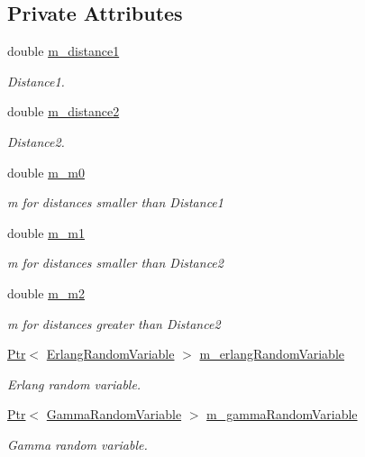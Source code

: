 \subsection*{Private Attributes}
\begin{DoxyCompactItemize}
\item 
double \hyperlink{classns3_1_1NakagamiPropagationLossModel_a4066585afe1a07e79bfc70bd64f06b80}{m\+\_\+distance1}
\begin{DoxyCompactList}\small\item\em Distance1. \end{DoxyCompactList}\item 
double \hyperlink{classns3_1_1NakagamiPropagationLossModel_a5b352f7546d5eb117c80bcc09fb76bca}{m\+\_\+distance2}
\begin{DoxyCompactList}\small\item\em Distance2. \end{DoxyCompactList}\item 
double \hyperlink{classns3_1_1NakagamiPropagationLossModel_a188d8e524f49ac1dfcb56b7788807e6c}{m\+\_\+m0}
\begin{DoxyCompactList}\small\item\em m for distances smaller than Distance1 \end{DoxyCompactList}\item 
double \hyperlink{classns3_1_1NakagamiPropagationLossModel_aa233b3621162f0f006ca8d00ffb14bd6}{m\+\_\+m1}
\begin{DoxyCompactList}\small\item\em m for distances smaller than Distance2 \end{DoxyCompactList}\item 
double \hyperlink{classns3_1_1NakagamiPropagationLossModel_ac4d82f72fb23d6cc852de0348c686fc2}{m\+\_\+m2}
\begin{DoxyCompactList}\small\item\em m for distances greater than Distance2 \end{DoxyCompactList}\item 
\hyperlink{classns3_1_1Ptr}{Ptr}$<$ \hyperlink{classns3_1_1ErlangRandomVariable}{Erlang\+Random\+Variable} $>$ \hyperlink{classns3_1_1NakagamiPropagationLossModel_a0aac232ec149639051fd334436ea03b4}{m\+\_\+erlang\+Random\+Variable}
\begin{DoxyCompactList}\small\item\em Erlang random variable. \end{DoxyCompactList}\item 
\hyperlink{classns3_1_1Ptr}{Ptr}$<$ \hyperlink{classns3_1_1GammaRandomVariable}{Gamma\+Random\+Variable} $>$ \hyperlink{classns3_1_1NakagamiPropagationLossModel_a2674c7bd999e9c22176a606a1acc7ae1}{m\+\_\+gamma\+Random\+Variable}
\begin{DoxyCompactList}\small\item\em Gamma random variable. \end{DoxyCompactList}\end{DoxyCompactItemize}
